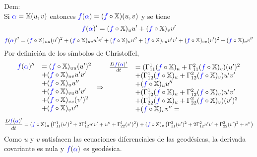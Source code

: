 \documentclass{article}
\newcommand{\bb}[1]{\mathbb{#1}}
\begin{document}
\textcolor{WildStrawberry}{Dem:}\\
Si $\textcolor{blue}{\alpha} = \bb{X}(u,v)$ entonces $\textcolor{blue}{f}(\textcolor{blue}{\alpha})=(\textcolor{blue}{f}\circ\bb{X})(u,v)$ y se tiene
$$
\textcolor{blue}{f}(\textcolor{blue}{\alpha})' = (\textcolor{blue}{f}\circ\bb{X})_u u' + (\textcolor{blue}{f}\circ\bb{X})_v v'
$$
$$
\textcolor{blue}{f}(\textcolor{blue}{\alpha})'' = (\textcolor{blue}{f}\circ\bb{X})_{uu} (u')^2 + (\textcolor{blue}{f}\circ\bb{X})_{uv} u'v' + (\textcolor{blue}{f}\circ\bb{X})_u u'' + (\textcolor{blue}{f}\circ\bb{X})_{vu} u'v' + (\textcolor{blue}{f}\circ\bb{X})_{vv} (v')^2 + (\textcolor{blue}{f}\circ\bb{X})_v v''
$$
Por definición de los símbolos de Christoffel,
$$
\begin{array}{ll}
\textcolor{blue}{f}(\textcolor{blue}{\alpha})'' &
   = (\textcolor{blue}{f}\circ\bb{X})_{uu} (u')^2 \\
 & + (\textcolor{blue}{f}\circ\bb{X})_{uv} u'v' \\
 & + (\textcolor{blue}{f}\circ\bb{X})_u u'' \\
 & + (\textcolor{blue}{f}\circ\bb{X})_{vu} u'v' \\
 & + (\textcolor{blue}{f}\circ\bb{X})_{vv} (v')^2 \\
 & + (\textcolor{blue}{f}\circ\bb{X})_v v''
\end{array}
\Rightarrow
\begin{array}{ll}
\frac{D\textcolor{blue}{f}(\textcolor{blue}{\alpha})'}{dt} &
   = (\Gamma_{11}^1 (\textcolor{blue}{f}\circ\bb{X})_u + \Gamma_{11}^2 (\textcolor{blue}{f}\circ\bb{X})_v ) (u')^2 \\
 & + (\Gamma_{12}^1 (\textcolor{blue}{f}\circ\bb{X})_u + \Gamma_{12}^2 (\textcolor{blue}{f}\circ\bb{X})_v ) u'v' \\
 & + (\textcolor{blue}{f}\circ\bb{X})_u u'' \\
 & + (\Gamma_{12}^1 (\textcolor{blue}{f}\circ\bb{X})_u + \Gamma_{12}^2 (\textcolor{blue}{f}\circ\bb{X})_v ) u'v' \\
 & + (\Gamma_{22}^1 (\textcolor{blue}{f}\circ\bb{X})_u + \Gamma_{22}^2 (\textcolor{blue}{f}\circ\bb{X})_v ) (v')^2 \\
 & + (\textcolor{blue}{f}\circ\bb{X})_v v'' =
\end{array}
$$
$$
\frac{D\textcolor{blue}{f}(\textcolor{blue}{\alpha})'}{dt} =
(\textcolor{blue}{f}\circ\bb{X})_u \left( \Gamma_{11}^1 (u')^2 + 2\Gamma_{12}^1 u'v' + u'' + \Gamma_{22}^1 (v')^2 \right) +
(\textcolor{blue}{f}\circ\bb{X})_v \left( \Gamma_{11}^2 (u')^2 + 2\Gamma_{12}^2 u'v' + \Gamma_{22}^2 (v')^2 + v''\right)
$$
Como $u$ y $v$ satisfacen las ecuaciones diferenciales de las geodésicas, la derivada covariante es nula y $\textcolor{blue}{f}(\textcolor{blue}{\alpha})$ es geodésica.\\\\
\end{document}
